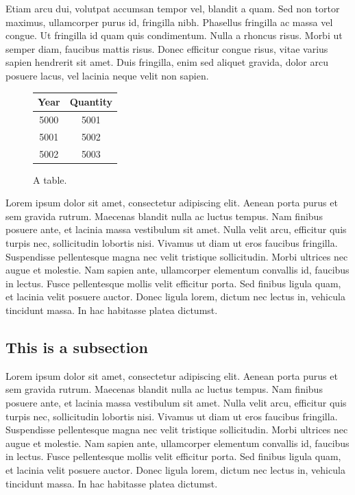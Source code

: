 \documentclass[11pt]{article}
\begin{document}
Etiam arcu dui, volutpat accumsan tempor vel, blandit a quam. Sed non tortor
maximus, ullamcorper purus id, fringilla nibh. Phasellus fringilla ac massa vel
congue. Ut fringilla id quam quis condimentum. Nulla a rhoncus risus. Morbi ut
semper diam, faucibus mattis risus. Donec efficitur congue risus, vitae varius
sapien hendrerit sit amet. Duis fringilla, enim sed aliquet gravida, dolor arcu
posuere lacus, vel lacinia neque velit non sapien.

\begin{figure}[h]
  \centering
  \begin{tabular}{*{2}{c}}
    \toprule
    Year & Quantity\\
    \midrule
    5000 & 5001\\
    \midrule
    5001 & 5002\\
    \midrule
    5002 & 5003\\
    \bottomrule
  \end{tabular}
  \caption{A table.}
\end{figure}

Lorem ipsum dolor sit amet, consectetur adipiscing elit. Aenean porta purus et
sem gravida rutrum. Maecenas blandit nulla ac luctus tempus. Nam finibus
posuere ante, et lacinia massa vestibulum sit amet. Nulla velit arcu, efficitur
quis turpis nec, sollicitudin lobortis nisi. Vivamus ut diam ut eros faucibus
fringilla. Suspendisse pellentesque magna nec velit tristique sollicitudin.
Morbi ultrices nec augue et molestie. Nam sapien ante, ullamcorper elementum
convallis id, faucibus in lectus. Fusce pellentesque mollis velit efficitur
porta. Sed finibus ligula quam, et lacinia velit posuere auctor. Donec ligula
lorem, dictum nec lectus in, vehicula tincidunt massa. In hac habitasse platea
dictumst.

\subsection{This is a subsection}

Lorem ipsum dolor sit amet, consectetur adipiscing elit.
Aenean porta purus et sem gravida rutrum.
Maecenas blandit nulla ac luctus tempus.
Nam finibus posuere ante, et lacinia massa vestibulum sit amet.
Nulla velit arcu, efficitur quis turpis nec, sollicitudin lobortis nisi.
Vivamus ut diam ut eros faucibus fringilla.
Suspendisse pellentesque magna nec velit tristique sollicitudin.
Morbi ultrices nec augue et molestie.
Nam sapien ante, ullamcorper elementum convallis id, faucibus in lectus.
Fusce pellentesque mollis velit efficitur porta.
Sed finibus ligula quam, et lacinia velit posuere auctor.
Donec ligula lorem, dictum nec lectus in, vehicula tincidunt massa.
In hac habitasse platea dictumst.
\end{document}
